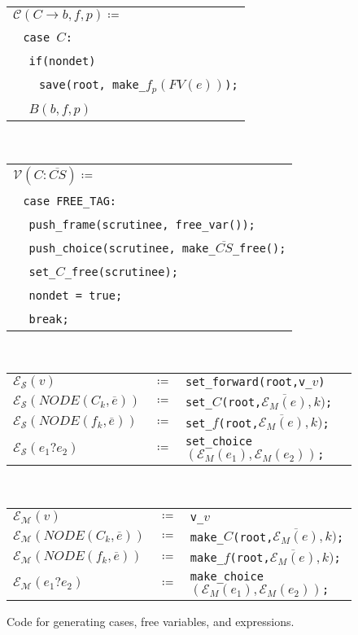 \documentclass{book}
\theoremstyle{definition}
\begin{document}
\begin{figure}
\noindent
\begin{tabular}{l}
$\mathcal{C}(C \to b, f, p) \coloneqq$\\
$\ \ $ \texttt{case }$C$\texttt{:}\\
$\ \ \ \ $ \texttt{if(nondet)}\\
$\ \ \ \ $ $\ \ $ \texttt{save(root, make\_}$f_p(FV(e))\texttt{}$\texttt{);}\\
$\ \ \ \ $ $B(b, f, p)$\\
\end{tabular}\\
$\ $\\
\begin{tabular}{l}
$\mathcal{V}(C:\overline{CS}) \coloneqq$\\
$\ \ $ \texttt{case FREE\_TAG:}\\
$\ \ \ \ $ \texttt{push\_frame(scrutinee, free\_var());}\\
$\ \ \ \ $ \texttt{push\_choice(scrutinee, make\_}$\overline{CS}$\texttt{\_free();}\\
$\ \ \ \ $ \texttt{set\_}$C$\texttt{\_free(scrutinee);}\\
$\ \ \ \ $ \texttt{nondet = true;}\\
$\ \ \ \ $ \texttt{break;}\\
\end{tabular}\\
$\ $\\
\begin{tabular}{lcl}
$\mathcal{E_S}(v)$ & $\coloneqq$ & \texttt{set\_forward(root,v\_}$v$\texttt{)}\\
$\mathcal{E_S}(NODE(C_k,\overline e))$ & $\coloneqq$ & \texttt{set\_}$C$\texttt{(root,}$\overline{\mathcal{E}_M(e)}, k)$\texttt{;}\\
$\mathcal{E_S}(NODE(f_k,\overline e))$ & $\coloneqq$ & \texttt{set\_}$f$\texttt{(root,}$\overline{\mathcal{E}_M(e)}, k)$\texttt{;}\\
$\mathcal{E_S}(e_1 ? e_2)$ & $\coloneqq$ & \texttt{set\_choice}$(\mathcal{E}_M(e_1), \mathcal{E}_M(e_2))$\texttt{;}\\
\end{tabular}\\
$\ $\\
\begin{tabular}{lcl}
$\mathcal{E_M}(v)$ & $\coloneqq$ & \texttt{v\_}$v$\\
$\mathcal{E_M}(NODE(C_k,\overline e))$ & $\coloneqq$ & \texttt{make\_}$C$\texttt{(root,}$\overline{\mathcal{E}_M(e)}, k)$\texttt{;}\\
$\mathcal{E_M}(NODE(f_k,\overline e))$ & $\coloneqq$ & \texttt{make\_}$f$\texttt{(root,}$\overline{\mathcal{E}_M(e)}, k)$\texttt{;}\\
$\mathcal{E_M}(e_1 ? e_2)$ & $\coloneqq$ & \texttt{make\_choice}$(\mathcal{E}_M(e_1), \mathcal{E}_M(e_2))$\texttt{;}\\
\end{tabular}
\caption{Code for generating cases, free variables, and expressions.}
\label{fig:cexpr}
\end{figure}
\end{document}
